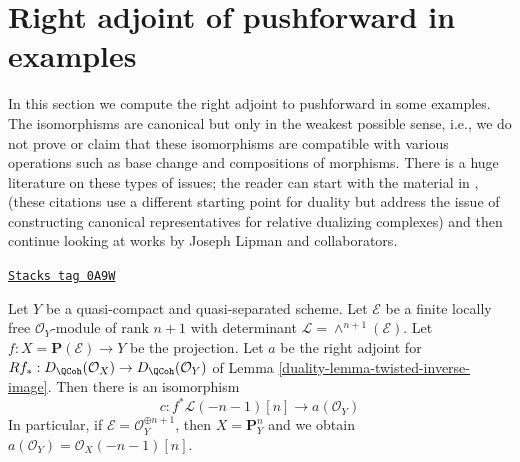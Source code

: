 \section{Right adjoint of pushforward in examples}
\label{duality-section-examples}
In this section we compute the right adjoint to pushforward in
some examples. The isomorphisms are canonical but only in the weakest
possible sense, i.e., we do not prove or claim that these isomorphisms are
compatible with various operations such as base change and compositions
of morphisms. There is a huge literature on these types of issues; the reader
can start with the material in \cite{RD}, \cite{Conrad-GD}
(these citations use a different starting point for duality but address the
issue of constructing canonical representatives for relative dualizing
complexes) and then continue looking at works by
Joseph Lipman and collaborators.

\begin{lemma}
\label{duality-lemma-upper-shriek-P1}
\href{https://stacks.math.columbia.edu/tag/0A9W}{\texttt{Stacks tag 0A9W}}

Let $Y$ be a quasi-compact and quasi-separated scheme.
Let $\mathcal{E}$ be a finite locally
free $\mathcal{O}_Y$-module of rank $n + 1$ with determinant
$\mathcal{L} = \wedge^{n + 1}(\mathcal{E})$.
Let $f : X = \mathbf{P}(\mathcal{E}) \to Y$ be the projection.
Let $a$ be the right adjoint for
$Rf_* : D_\QCoh(\mathcal{O}_X) \to D_\QCoh(\mathcal{O}_Y)$ of
Lemma \ref{duality-lemma-twisted-inverse-image}.
Then there is an isomorphism
$$
c : f^*\mathcal{L}(-n - 1)[n] \longrightarrow a(\mathcal{O}_Y)
$$
In particular, if $\mathcal{E} = \mathcal{O}_Y^{\oplus n + 1}$, then
$X = \mathbf{P}^n_Y$ and we obtain
$a(\mathcal{O}_Y) = \mathcal{O}_X(-n - 1)[n]$.
\end{lemma}

